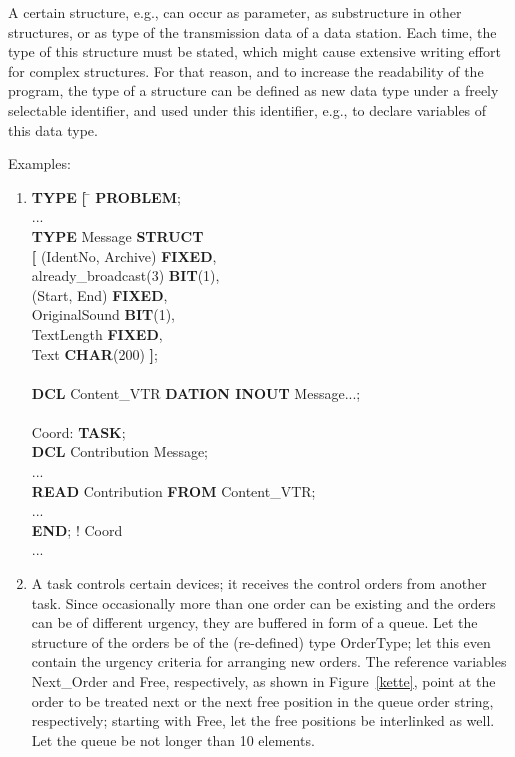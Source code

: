 A certain structure, e.g., can occur as parameter, as substructure in other
structures, or as type of the transmission data of a data station.  Each
time, the type of this structure must be stated, which might cause
extensive writing effort for complex structures. For that reason, and to
increase the readability of the program, the type of a structure can be
defined as new data type under a freely selectable identifier, and used
under this identifier, e.g., to declare variables of this data type.

Examples:
\begin{enumerate}
\item
\begin{tabbing}
\x \= {\bf TYPE} \= {\bf [} \= \kill
{\bf PROBLEM}; \> \> \> \\
  \> ... \> \> \\
  \> {\bf TYPE} \>         \> Message {\bf STRUCT}\\
  \>            \> {\bf [} \> (IdentNo, Archive) {\bf FIXED},\\
  \>            \>         \> already\_broadcast(3) {\bf BIT}(1),\\
  \>            \>         \> (Start, End) {\bf FIXED},\\
  \>            \>         \> OriginalSound {\bf BIT}(1),\\
  \>            \>         \> TextLength {\bf FIXED},\\
  \>            \>         \> Text {\bf CHAR}(200) {\bf ]};\\
  \>            \>         \> \\
  \> {\bf DCL}  \>         \> Content\_VTR {\bf DATION INOUT} Message...;\\
  \>            \>         \> \\
  \> Coord:     \>         \> {\bf TASK};\\
  \>            \>         \> {\bf DCL} Contribution Message;\\
  \>            \>         \> ...\\
  \>            \>         \> {\bf READ} Contribution {\bf FROM} Content\_VTR;\\
  \>            \>         \> ...\\
  \>            \>         \> {\bf END}; ! Coord\\
  \> ...        \>         \>
\end{tabbing}
\item A task controls certain devices; it receives the control orders
from another task. Since occasionally more than one order can be
existing and the orders can be of different urgency, they are buffered
in form of a queue. Let the structure of the orders be of the (re-defined)
type OrderType; let this even contain the urgency criteria for
arranging new orders. The reference variables Next\_Order and Free,
respectively, as shown in Figure~\ref{kette}, point at the order to be treated next or the next free position
in the queue order string, respectively; starting with Free, let the free
positions be interlinked as well. Let the queue be not longer than 10
elements.



\end{enumerate}
